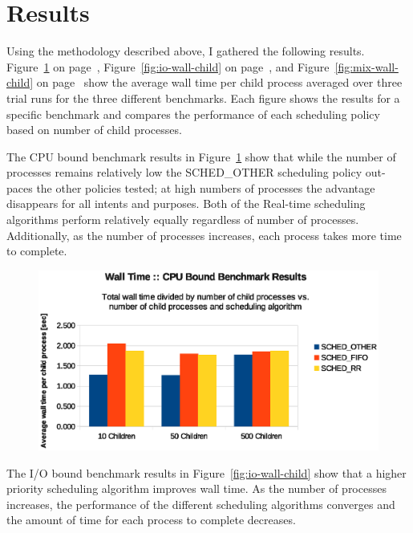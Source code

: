 ﻿\section{Results}


Using the methodology described above, I gathered the following results. Figure~\ref{fig:cpu-wall-child} on page~\pageref{fig:cpu-wall-child}, Figure~\ref{fig:io-wall-child} on page~\pageref{fig:io-wall-child}, and Figure~\ref{fig:mix-wall-child} on page~\pageref{fig:mix-wall-child} show the average wall time per child process averaged over three trial runs for the three different benchmarks.  Each figure shows the results for a specific benchmark and compares the performance of each scheduling policy based on number of child processes.

The CPU bound benchmark results in Figure~\ref{fig:cpu-wall-child} show that while the number of processes remains relatively low the SCHED\_OTHER scheduling policy out-paces the other policies tested; at high numbers of processes the advantage disappears for all intents and purposes.  Both of the Real-time scheduling algorithms perform relatively equally regardless of number of processes.  Additionally, as the number of processes increases, each process takes more time to complete.

\begin{figure}[H]
  \centering
  \includegraphics[scale=0.8]{img/cpu-wall-child.eps}
  \caption{}
  \label{fig:cpu-wall-child}
\end{figure}

The I/O bound benchmark results in Figure~\ref{fig:io-wall-child} show that a higher priority scheduling algorithm improves wall time.  As the number of processes increases, the performance of the different scheduling algorithms converges and the amount of time for each process to complete decreases.

